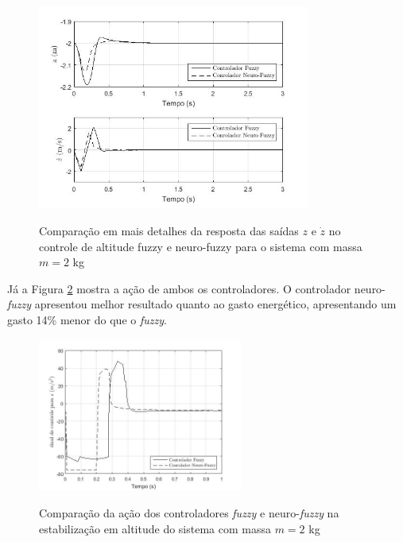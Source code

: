 \begin{figure}[!htb]
    \centering
    \caption{Comparação em mais detalhes da resposta das saídas $z$ e $\dot{z}$ no controle de altitude fuzzy e neuro-fuzzy para o sistema com massa $m=2$ kg}
    \includegraphics[width=0.8\textwidth]{./04-figuras/figuras_pos_banca/5-altitude2kg/graph_z_zdot_2kg_details}
    \label{fig:altitude_z_zdot_2kg_closer}
\end{figure}

Já a Figura \ref{fig:graph_control_z} mostra a ação de ambos os controladores. O controlador neuro-\textit{fuzzy} apresentou melhor resultado quanto ao gasto energético, apresentando um gasto 14\% menor do que o \textit{fuzzy}.

\begin{figure}[!htb]
    \centering
    \caption{Comparação da ação dos controladores \textit{fuzzy} e neuro-\textit{fuzzy} na estabilização em altitude do sistema com massa $m=2$ kg}
    \includegraphics[width=0.6\textwidth]{./04-figuras/figuras_pos_banca/5-altitude2kg/graph_control_z}
    \label{fig:graph_control_z}
\end{figure}


